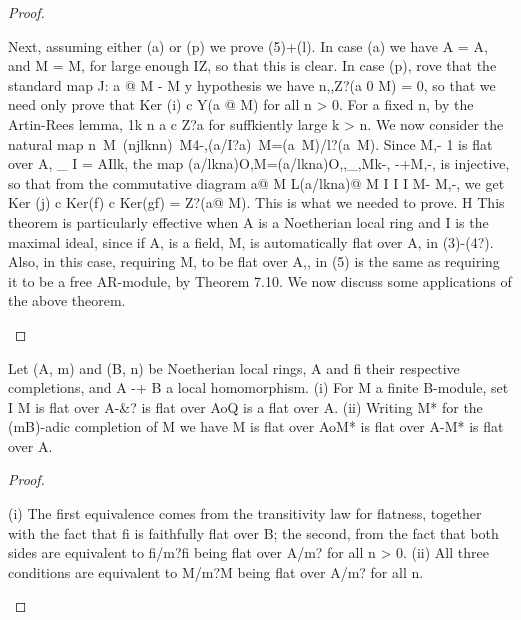 \begin{proof}
\begin{mathematicalrecord}
    Next, assuming either (a) or (p) we prove (5)+(l).    In case (a) we have
 A = A, and M = M, for large enough IZ, so that this is clear. In case (p),
                                 rove that the standard map J: a @ M -      M
                                   y hypothesis we have n,,Z?(a 0 M) = 0, so
 that we need only prove that Ker (i) c Y(a @ M) for all n > 0. For a fixed n,
 by the Artin-Rees   lemma, 1k n a c Z?a for suffkiently large k > n. We now
 consider the natural map
n~M~(njlknn)~M4-,(a/I?a)~M=(a~M)/l?(a~M).
Since M,- 1 is flat over A, _ I = AIlk, the map
         (a/lkna)O,M=(a/lkna)O,,_,Mk-,               -+M,-,
is injective, so that from the commutative      diagram
         a@ M L(a/lkna)@             M
          I
           I                  I
          M-                  M,-,
we get Ker (j) c Ker(f) c Ker(gf) = Z?(a@ M). This is what we needed to
prove. H
   This theorem is particularly effective when A is a Noetherian local ring
and I is the maximal ideal, since if A, is a field, M, is automatically flat
over A, in (3)-(4?). Also, in this case, requiring M, to be flat over A,, in
(5) is the same as requiring it to be a free AR-module, by Theorem 7.10.
   We now discuss some applications of the above theorem.
\end{mathematicalrecord}
\end{proof}


\begin{theorem}[Theorem 22.4]\label{mcrt-auto-theorem-22-4}\uses{}
\begin{mathematicalrecord}
Let (A, m) and (B, n) be Noetherian local rings, A and fi
their respective completions, and A -+ B a local homomorphism.
   (i) For M a finite B-module, set I%
           M is flat over A-&?   is flat over AoQ    is a flat over A.
   (ii) Writing M* for the (mB)-adic completion of M we have
           M is flat over AoM*     is flat over A-M*    is flat over A.
\end{mathematicalrecord}
\end{theorem}
\begin{proof}
\begin{mathematicalrecord}
(i) The first equivalence comes from the transitivity law for flatness,
together with the fact that fi is faithfully flat over B; the second, from
the fact that both sides are equivalent to fi/m?fi      being flat over A/m?
for all n > 0.
   (ii) All three conditions are equivalent to M/m?M being flat over A/m?
for all n.
\end{mathematicalrecord}
\end{proof}


